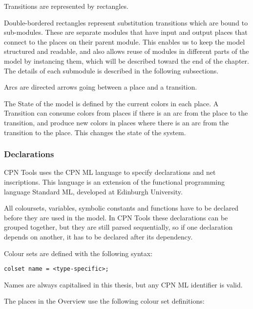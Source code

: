 	Transitions are represented by rectangles. 
	
	Double-bordered rectangles represent substitution transitions which are bound
	to sub-modules. These are separate modules that have input and output places
	that connect to the places on their parent module. This enables us to keep
	the model structured and readable, and also allows reuse of modules in
	different parts of the model by instancing them, which will be described toward
	the end of the chapter. The details of each submodule is described in the
	following subsections.
	
	Arcs are directed arrows going between a place and a transition.
	
	The State of the model is defined by the current colors in
	each place. A Transition can consume colors from places if there is an arc from
	the place to the transition, and produce new colors in places where there is an
	arc from the transition to the place. This changes the state of the system.
	
	
	\subsubsection{Declarations}
	
	CPN Tools uses the CPN ML language to specify declarations and net inscriptions.
	This language is an extension of the functional programming language Standard
	ML, developed at Edinburgh University.
	
	All coloursets, variables, symbolic constants and functions have to be declared
	before they are used in the model. In CPN Tools these declarations can be
	grouped together, but they are still parsed sequentially, so if one declaration
	depends on another, it has to be declared after its dependency.

	Colour sets are defined with the following syntax:
	
	\lstinline:colset name = <type-specific>;:
	
	Names are always capitalised in this thesis, but any CPN ML identifier is
	valid.
	
	The places in the Overview use the following colour set definitions:
	
